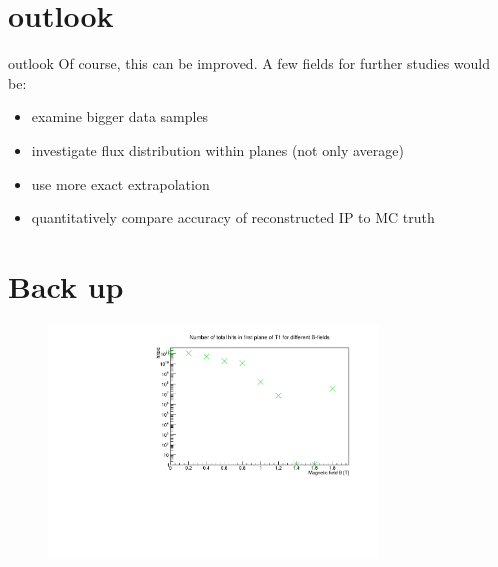 \section{outlook}

\begin{frame}[t]{outlook}
  \vspace*{\fill}
    Of course, this can be improved. A few fields for further studies would be:
    \begin{itemize}
      \item examine bigger data samples
      \item investigate flux distribution within planes (not only average)
      \item use more exact extrapolation
      \item quantitatively compare accuracy of reconstructed IP to MC truth
    \end{itemize}
  \vspace*{\fill}
\end{frame}

\section{Back up}
\appendix

\begin{frame}
  \begin{figure}
    \centering
    \includegraphics[width=0.78\textwidth]{hits_bfield.pdf}
  \end{figure}
\end{frame}

